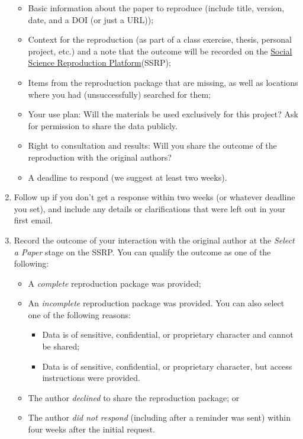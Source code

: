 \documentclass[
  openany]{book}
\providecommand{\tightlist}{%
  \setlength{\itemsep}{0pt}\setlength{\parskip}{0pt}}
\begin{document}
\begin{enumerate}
  \begin{itemize}
  \tightlist
  \item
    Basic information about the paper to reproduce (include title, version, date, and a DOI (or just a URL));\\
  \item
    Context for the reproduction (as part of a class exercise, thesis, personal project, etc.) and a note that the outcome will be recorded on the \href{https://www.socialsciencereproduction.org/}{Social Science Reproduction Platform}(SSRP);
  \item
    Items from the reproduction package that are missing, as well as locations where you had (unsuccessfully) searched for them;\\
  \item
    Your use plan: Will the materials be used exclusively for this project? Ask for permission to share the data publicly.\\
  \item
    Right to consultation and results: Will you share the outcome of the reproduction with the original authors?\\
  \item
    A deadline to respond (we suggest at least two weeks).
  \end{itemize}
\item
  Follow up if you don't get a response within two weeks (or whatever deadline you set), and include any details or clarifications that were left out in your first email.
\item
  Record the outcome of your interaction with the original author at the \emph{Select a Paper} stage on the SSRP. You can qualify the outcome as one of the following:

  \begin{itemize}
  \tightlist
  \item
    A \emph{complete} reproduction package was provided;
  \item
    An \emph{incomplete} reproduction package was provided. You can also select one of the following reasons:

    \begin{itemize}
    \tightlist
    \item
      Data is of sensitive, confidential, or proprietary character and cannot be shared;
    \item
      Data is of sensitive, confidential, or proprietary character, but access instructions were provided.
    \end{itemize}
  \item
    The author \emph{declined} to share the reproduction package; or
  \item
    The author \emph{did not respond} (including after a reminder was sent) within four weeks after the initial request.
  \end{itemize}
\end{enumerate}
\end{document}
